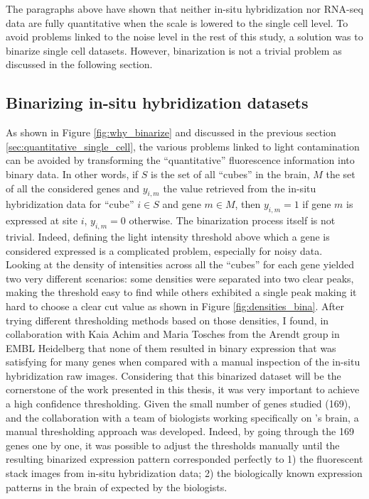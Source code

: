 	The paragraphs above have shown that neither in-situ hybridization nor RNA-seq data are fully quantitative when the scale is lowered to the single cell level. To avoid problems linked to the noise level in the rest of this study, a solution was to binarize single cell datasets. However, binarization is not a trivial problem as discussed in the following section.
	
	
  \subsection{Binarizing in-situ hybridization datasets}
	As shown in Figure \ref{fig:why_binarize} and discussed in the previous section \ref{sec:quantitative_single_cell}, the various problems linked to light contamination can be avoided by transforming the ``quantitative'' fluorescence information into binary data. In other words, if $S$ is the set of all ``cubes'' in the brain, $M$ the set of all the considered genes and $y_{i,m}$ the value retrieved from the in-situ hybridization data for ``cube'' $i \in S$ and gene $m \in M$, then  $y_{i,m} = 1$ if gene $m$ is expressed at site $i$, $y_{i,m} = 0$ otherwise. The binarization process itself is not trivial. Indeed, defining the light intensity threshold above which a gene is considered expressed is a complicated problem, especially for noisy data.\\

	Looking at the density of intensities across all the ``cubes'' for each gene yielded two very different scenarios: some densities were separated into two clear peaks, making the threshold easy to find while others exhibited a single peak making it hard to choose a clear cut value as shown in Figure \ref{fig:densities_bina}. After trying different thresholding methods based on those densities, I found, in collaboration with Kaia Achim and Maria Tosches from the Arendt group in EMBL Heidelberg that none of them resulted in binary expression that was satisfying for many genes when compared with a manual inspection of the in-situ hybridization raw images. Considering that this binarized dataset will be the cornerstone of the work presented in this thesis, it was very important to achieve a high confidence thresholding. Given the small number of genes studied (169), and the collaboration with a team of biologists working specifically on \platyfull{}'s brain, a manual thresholding approach was developed. Indeed, by going through the 169 genes one by one, it was possible to adjust the thresholds manually until the resulting binarized expression pattern corresponded perfectly to 1) the fluorescent stack images from in-situ hybridization data; 2) the biologically known expression patterns in the brain of \platy{} expected by the biologists.\\
	
